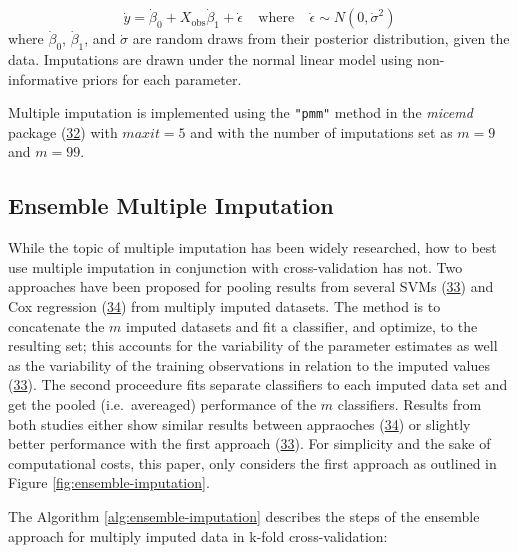 \documentclass[12pt,]{article}
\begin{document}
\[
\dot{y} = \dot{\beta}_0 + X_{\text{obs}}\dot{\beta}_1 + \dot{\epsilon} ~~~~~\text{where}~~~~~ \dot{\epsilon} \sim N(0, \dot{\sigma}^2)   \tag{9}
\] where \(\dot{\beta}_0\), \(\dot{\beta}_1\), and \(\dot{\sigma}\) are
random draws from their posterior distribution, given the data.
Imputations are drawn under the normal linear model using
non-informative priors for each parameter.

Multiple imputation is implemented using the \texttt{"pmm"} method in
the \emph{micemd} package
(\protect\hyperlink{ref-team_micemd:_2019}{32}) with \(maxit = 5\) and
with the number of imputations set as \(m=9\) and \(m=99\).

\subsection{Ensemble Multiple
Imputation}\label{ensemble-multiple-imputation}

While the topic of multiple imputation has been widely researched, how
to best use multiple imputation in conjunction with cross-validation has
not. Two approaches have been proposed for pooling results from several
SVMs (\protect\hyperlink{ref-belanche_handling_2014}{33}) and Cox
regression (\protect\hyperlink{ref-zavrakidis_combining_2017}{34}) from
multiply imputed datasets. The method is to concatenate the \(m\)
imputed datasets and fit a classifier, and optimize, to the resulting
set; this accounts for the variability of the parameter estimates as
well as the variability of the training observations in relation to the
imputed values (\protect\hyperlink{ref-belanche_handling_2014}{33}). The
second proceedure fits separate classifiers to each imputed data set and
get the pooled (i.e.~avereaged) performance of the \(m\) classifiers.
Results from both studies either show similar results between appraoches
(\protect\hyperlink{ref-zavrakidis_combining_2017}{34}) or slightly
better performance with the first approach
(\protect\hyperlink{ref-belanche_handling_2014}{33}). For simplicity and
the sake of computational costs, this paper, only considers the first
approach as outlined in Figure \ref{fig:ensemble-imputation}.

The Algorithm \ref{alg:ensemble-imputation} describes the steps of the
ensemble approach for multiply imputed data in k-fold cross-validation:
\end{document}
